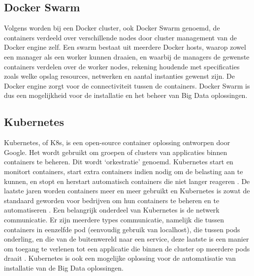 \subsection{Docker Swarm}
Volgens \textcite{Docker2023b} worden bij een Docker cluster, ook Docker Swarm genoemd, de containers verdeeld over verschillende nodes door cluster management van de Docker engine zelf. Een swarm bestaat uit meerdere Docker hosts, waarop zowel een manager als een worker kunnen draaien, en waarbij de managers de gewenste containers verdelen over de worker nodes, rekening houdende met specificaties zoals welke opslag resources, netwerken en aantal instanties gewenst zijn. De Docker engine zorgt voor de connectiviteit tussen de containers.
\newline
\newline
Docker Swarm is dus een mogelijkheid voor de installatie en het beheer van Big Data oplossingen.


\subsection{Kubernetes}
Kubernetes, of K8s, is een open-source container oplossing ontworpen door Google. Het wordt gebruikt om groepen of clusters van applicaties binnen containers te beheren. Dit wordt ‘orkestratie’ genoemd.
\newline
Kubernetes start en monitort containers, start extra containers indien nodig om de belasting aan te kunnen, en stopt en herstart automatisch containers die niet langer reageren \autocite{Guthrie2022}.
\newline
\newline
De laatste jaren worden containers meer en meer gebruikt en Kubernetes is zowat de standaard geworden voor bedrijven om hun containers te beheren en te automatiseren \autocite{Razorops2022}.
\newline
\newline
Een belangrijk onderdeel van Kubernetes is de netwerk communicatie. Er zijn meerdere types communicatie, namelijk die tussen containers in eenzelfde pod (eenvoudig gebruik van localhost), die tussen pods onderling, en die van de buitenwereld naar een service, deze laatste is een manier om toegang te verlenen tot een applicatie die binnen de cluster op meerdere pods draait \autocite{Kubernetes2023a} \autocite{Kubernetes2023b}.
\newline
\newline
Kubernetes is ook een mogelijke oplossing voor de automatisatie van installatie van de Big Data oplossingen.


